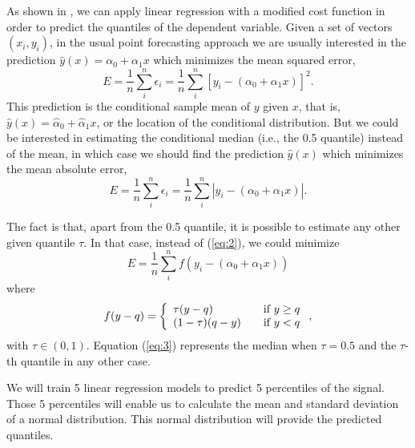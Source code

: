 \documentclass[a4paper,3p,sort&compress]{elsarticle}
\begin{document}
As shown in \cite{koenker_regression_1978}, we can apply linear
regression with a modified cost function in order to predict the
quantiles of the dependent variable.  Given a set of vectors
$(x_i, y_i)$, in the usual point forecasting approach we are usually
interested in the prediction $\hat y(x) = \alpha_0 + \alpha_1 x$ which
minimizes the mean squared error,
\begin{equation}
  \label{eq:1}
  E = \frac{1}{n} \sum^n_i \epsilon_i =
  \frac{1}{n} \sum^n_i [ y_i - (\alpha_0 + \alpha_1 x) ]^2.
\end{equation}
This prediction is the conditional sample mean of $y$ given $x$, that
is, $\hat y(x) = \hat\alpha_0 + \hat\alpha_1 x$, or the location of
the conditional distribution. But we could be interested in estimating
the conditional median (i.e., the 0.5 quantile) instead of the mean,
in which case we should find the prediction $\hat y(x)$ which
minimizes the mean absolute error,
\begin{equation}
  \label{eq:2}
  E = \frac{1}{n} \sum^n_i \epsilon_i =
  \frac{1}{n} \sum^n_i | y_i - (\alpha_0 + \alpha_1 x) |.
\end{equation}

The fact is that, apart from the 0.5 quantile, it is possible to
estimate any other given quantile $\tau$. In that case, instead of
(\ref{eq:2}), we could minimize
\begin{equation}
  \label{eq:3}
  E= \frac{1}{n} \sum^n_i f( y_i - (\alpha_0 + \alpha_1 x))
\end{equation}
where
\begin{equation}
  \label{eq:4}
  f(y-q) = \left\{ 
    \begin{array}{l l}
      \tau (y-q) & \quad \mbox{if $y \ge q$}\\
      (1-\tau) (q-y) & \quad \mbox{if $y < q$}\\
    \end{array} \right.,
\end{equation}
with $\tau \in (0,1)$. Equation (\ref{eq:3}) represents the median
when $\tau=0.5$ and the $\tau$-th quantile in any other case.

We will train 5 linear regression models to predict 5 percentiles of
the signal. Those 5 percentiles will enable us to calculate the mean 
and standard deviation of a normal distribution. This normal distribution
will provide the predicted quantiles.
\end{document}
